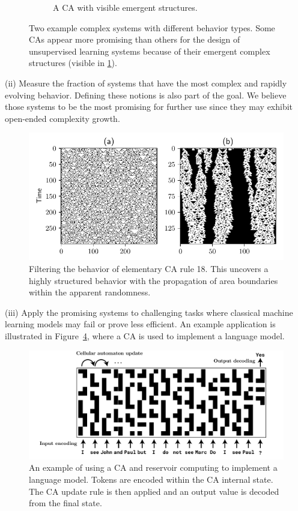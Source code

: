 \begin{figure}[htbp]
\begin{subfigure}[b]{.4\linewidth}
  \caption{A \acl{CA} with visible emergent structures.}
  \label{fig:structured_sys}
\end{subfigure}
\caption{Two example complex systems with different behavior types. Some
  \aclp{CA} appear more promising than others for the design of unsupervised
  learning systems because of their emergent complex structures (visible in \ref{fig:structured_sys}).}
  \label{fig:comparison_ca}
\end{figure}

(ii) Measure the fraction of systems that have the most complex and rapidly
evolving behavior. Defining these notions is also part of the goal. We believe
those systems to be the most promising for further use since they may exhibit
open-ended complexity growth.

\begin{figure}[htbp]
  \centering
 \includegraphics[width=.9\linewidth]{figures/rule18_small}
 \caption{Filtering the behavior of elementary \acl{CA} rule 18. This
   uncovers a highly structured behavior with the propagation of area boundaries
   within the apparent randomness.}
  \label{fig:rule_18}
\end{figure}


(iii) Apply the promising systems to challenging tasks where classical machine
learning models may fail or prove less efficient. An example application is
illustrated in Figure~\ref{fig:ca_lm}, where a \ac{CA} is used to
implement a language model.

\begin{figure}[htbp]
  \centering
  \includegraphics[width=.9\linewidth]{figures/ca_lm}
  \caption{An example of using a \acl{CA} and reservoir computing to implement a
    language model. Tokens are encoded within the \acl{CA} internal state. The
    \acl{CA} update rule is then applied and an output value is decoded from the
    final state.}
  \label{fig:ca_lm}
\end{figure}


